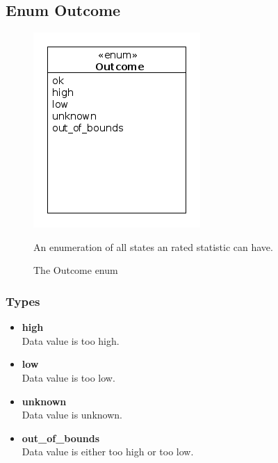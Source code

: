\subsection{Enum Outcome}
\begin{figure}[htbp]
	\begin{minipage}[t]{8cm}
		\vspace{0pt}
		\centering
		\includegraphics[scale=0.6]{./diagram_pictures/reactor/Outcome.png}
		\caption{The Outcome enum}
	\end{minipage}
	\hfill
	\begin{minipage}[t]{8cm}
		\vspace{10pt}
			An enumeration of all states an rated statistic can have.
	\end{minipage}
\end{figure}  

\subsubsection{Types}
\begin{itemize}
	\item \textbf{ high }\\
	Data value is too high.
	\item \textbf{ low }\\
	Data value is too low.
	\item \textbf{ unknown }\\
	Data value is unknown.
	\item \textbf{ out\_of\_bounds }\\
	Data value is either too high or too low.
\end{itemize}


\newpage
